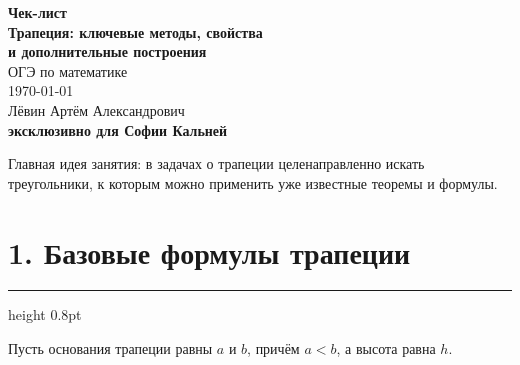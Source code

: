\documentclass[a4paper,12pt]{article}
\newcommand{\sectionline}{
  \par
  \vspace{0.2em}
  {\color{accent}\hrule height 0.8pt}
  \vspace{0.7em}
}
\begin{document}

\begin{titlepage}
\thispagestyle{empty}
\centering

\vspace*{2.6cm}

{\Large\color{darkaccent}\textbf{Чек-лист}}\\[0.8em]

{\LARGE\textbf{
Трапеция: ключевые методы, свойства\\
и дополнительные построения
}}\\[1.2em]

{\large ОГЭ по математике}\\[2.2em]

{\large \today}\\[2.5em]

{\large Лёвин Артём Александрович}\\[0.35em]

{\large\textbf{эксклюзивно для Софии Кальней}}\\[3em]

\begin{minipage}{0.78\textwidth}
\centering
\color{textgray}
Главная идея занятия: в задачах о трапеции целенаправленно искать
треугольники, к которым можно применить уже известные теоремы
и формулы.
\end{minipage}

\vfill


\end{titlepage}


\section*{1. Базовые формулы трапеции}
\sectionline

Пусть основания трапеции равны $a$ и $b$, причём $a<b$,
а высота равна $h$.
\end{document}
